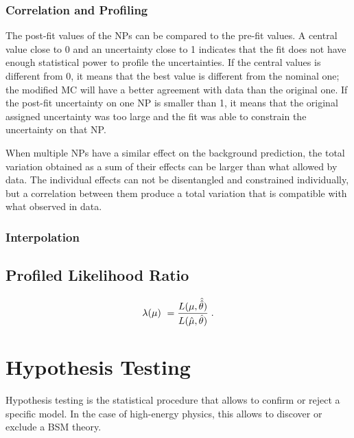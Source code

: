 \subsubsection*{Correlation and Profiling}

The post-fit values of the NPs can be compared to the pre-fit values. A central value close to 0 and an uncertainty close to 1 indicates that the fit does not have enough statistical power to profile the uncertainties. If the central values is different from 0, it means that the best value is different from the nominal one; the modified MC will have a better agreement with data than the original one. If the post-fit uncertainty on one NP is smaller than 1, it means that the original assigned uncertainty was too large and the fit was able to constrain the uncertainty on that NP.

When multiple NPs have a similar effect on the background prediction, the total variation obtained as a sum of their effects can be larger than what allowed by data. The individual effects can not be disentangled and constrained individually, but a correlation between them produce a total variation that is compatible with what observed in data. %

\subsubsection*{Interpolation}

\subsection{Profiled Likelihood Ratio}

\begin{equation}
\label{eq:stat:prl}
\lambda(\mu) \  = \frac{ L(\mu,
\hat{\hat{\theta}}) } {L(\hat{\mu}, \hat{\theta}) } \;.
\end{equation}


\section{Hypothesis Testing}
\label{sec:stat:ht}

Hypothesis testing is the statistical procedure that allows to confirm or reject a specific model. In the case of high-energy physics, this allows to discover or exclude a BSM theory. 

